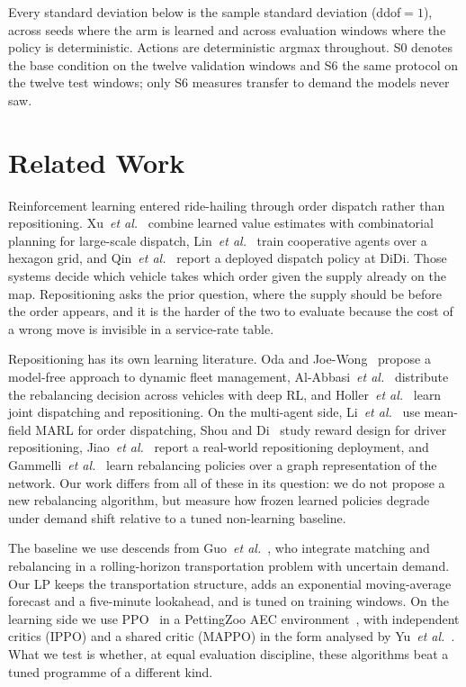 \documentclass[conference]{IEEEtran}
\begin{document}
Every standard deviation below is the sample standard deviation
(ddof${}=1$), across seeds where the arm is learned and across evaluation
windows where the policy is deterministic. Actions are deterministic argmax
throughout. S0 denotes the base condition on the twelve validation windows and
S6 the same protocol on the twelve test windows; only S6 measures transfer to
demand the models never saw.

\section{Related Work}
\label{sec:related}

Reinforcement learning entered ride-hailing through order dispatch rather than
repositioning. Xu~\emph{et al.}~\cite{xu2018} combine learned value estimates
with combinatorial planning for large-scale dispatch, Lin~\emph{et
al.}~\cite{lin2018} train cooperative agents over a hexagon grid, and
Qin~\emph{et al.}~\cite{qin2020} report a deployed dispatch policy at DiDi.
Those systems decide which vehicle takes which order given the supply already
on the map. Repositioning asks the prior question, where the supply should be
before the order appears, and it is the harder of the two to evaluate because
the cost of a wrong move is invisible in a service-rate table.

Repositioning has its own learning literature. Oda and
Joe-Wong~\cite{oda2018} propose a model-free approach to dynamic fleet
management, Al-Abbasi~\emph{et al.}~\cite{alabbasi2019} distribute the
rebalancing decision across vehicles with deep RL, and Holler~\emph{et
al.}~\cite{holler2019} learn joint dispatching and repositioning. On the
multi-agent side, Li~\emph{et al.}~\cite{li2019} use mean-field MARL for
order dispatching, Shou and Di~\cite{shou2020} study reward design for driver
repositioning, Jiao~\emph{et al.}~\cite{jiao2021} report a real-world
repositioning deployment, and Gammelli~\emph{et al.}~\cite{gammelli2021}
learn rebalancing policies over a graph representation of the network. Our
work differs from all of these in its question: we do not propose a new
rebalancing algorithm, but measure how frozen learned policies degrade under
demand shift relative to a tuned non-learning baseline.

The baseline we use descends from Guo~\emph{et
al.}~\cite{guo2021}, who integrate matching and rebalancing in a
rolling-horizon transportation problem with uncertain demand. Our LP keeps the
transportation structure, adds an exponential moving-average forecast and a
five-minute lookahead, and is tuned on training windows. On the learning side
we use PPO~\cite{schulman2017} in a PettingZoo AEC
environment~\cite{pettingzoo}, with independent critics (IPPO) and a shared
critic (MAPPO) in the form analysed by Yu~\emph{et al.}~\cite{yu2022}. What
we test is whether, at equal evaluation discipline, these algorithms beat a
tuned programme of a different kind.
\end{document}
